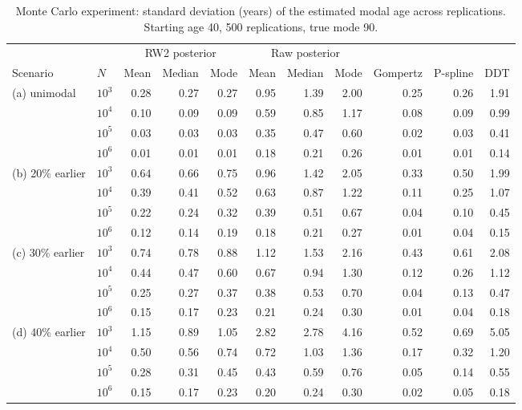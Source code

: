 \begin{table}[htb!]
\centering
\caption{Monte Carlo experiment: standard deviation (years) of the estimated modal age across replications. Starting age 40, 500 replications, true mode 90.}
\label{tab:app_sd}
\scriptsize
\setlength{\tabcolsep}{4pt}
\begin{tabular}{llrrrrrrrrr}
\hline
 & & \multicolumn{3}{c}{RW2 posterior} & \multicolumn{3}{c}{Raw posterior} & & & \\
Scenario & $N$ & Mean & Median & Mode & Mean & Median & Mode & Gompertz & P-spline & DDT \\
\hline
(a) unimodal & $10^3$ & 0.28 & 0.27 & 0.27 & 0.95 & 1.39 & 2.00 & 0.25 & 0.26 & 1.91 \\
 & $10^4$ & 0.10 & 0.09 & 0.09 & 0.59 & 0.85 & 1.17 & 0.08 & 0.09 & 0.99 \\
 & $10^5$ & 0.03 & 0.03 & 0.03 & 0.35 & 0.47 & 0.60 & 0.02 & 0.03 & 0.41 \\
 & $10^6$ & 0.01 & 0.01 & 0.01 & 0.18 & 0.21 & 0.26 & 0.01 & 0.01 & 0.14 \\[2pt]
(b) 20\% earlier & $10^3$ & 0.64 & 0.66 & 0.75 & 0.96 & 1.42 & 2.05 & 0.33 & 0.50 & 1.99 \\
 & $10^4$ & 0.39 & 0.41 & 0.52 & 0.63 & 0.87 & 1.22 & 0.11 & 0.25 & 1.07 \\
 & $10^5$ & 0.22 & 0.24 & 0.32 & 0.39 & 0.51 & 0.67 & 0.04 & 0.10 & 0.45 \\
 & $10^6$ & 0.12 & 0.14 & 0.19 & 0.18 & 0.21 & 0.27 & 0.01 & 0.04 & 0.15 \\[2pt]
(c) 30\% earlier & $10^3$ & 0.74 & 0.78 & 0.88 & 1.12 & 1.53 & 2.16 & 0.43 & 0.61 & 2.08 \\
 & $10^4$ & 0.44 & 0.47 & 0.60 & 0.67 & 0.94 & 1.30 & 0.12 & 0.26 & 1.12 \\
 & $10^5$ & 0.25 & 0.27 & 0.37 & 0.38 & 0.53 & 0.70 & 0.04 & 0.13 & 0.47 \\
 & $10^6$ & 0.15 & 0.17 & 0.23 & 0.21 & 0.24 & 0.30 & 0.01 & 0.04 & 0.18 \\[2pt]
(d) 40\% earlier & $10^3$ & 1.15 & 0.89 & 1.05 & 2.82 & 2.78 & 4.16 & 0.52 & 0.69 & 5.05 \\
 & $10^4$ & 0.50 & 0.56 & 0.74 & 0.72 & 1.03 & 1.36 & 0.17 & 0.32 & 1.20 \\
 & $10^5$ & 0.28 & 0.31 & 0.45 & 0.43 & 0.59 & 0.76 & 0.05 & 0.14 & 0.55 \\
 & $10^6$ & 0.15 & 0.17 & 0.23 & 0.20 & 0.24 & 0.30 & 0.02 & 0.05 & 0.18 \\
\hline
\end{tabular}
\end{table}
